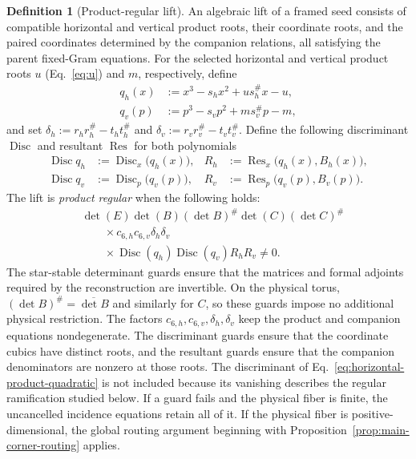 \documentclass[aps,prx,reprint,nofootinbib,twoside,superscriptaddress,longbibliography,floatfix]{revtex4-2}
\theoremstyle{definition}
\newtheorem{definition}[theorem]{Definition}
\begin{document}
\begin{definition}[Product-regular lift]
\label{def:product-regularity}
An algebraic lift of a framed seed consists of compatible horizontal and vertical product roots, their coordinate roots, and the paired coordinates determined by the companion relations, all satisfying the parent fixed-Gram equations. For the selected horizontal and vertical product roots $u$ (Eq.~\ref{eq:u}) and $m$, respectively, define
\begin{equation}
\begin{aligned}
q_h(x)&:=x^3-s_hx^2+us_h^\#x-u,\\
q_v(p)&:=p^3-s_vp^2+ms_v^\#p-m,
\end{aligned}
\end{equation}
and set $\delta_h:=r_hr_h^\#-t_ht_h^\#$ and $\delta_v:=r_vr_v^\#-t_vt_v^\#$. Define the following discriminant $\operatorname{Disc}$ and resultant $\operatorname{Res}$ for both polynomials
\begin{equation}
\begin{aligned}
\operatorname{Disc}q_h&:=\operatorname{Disc}_x\bigl(q_h(x)\bigr),&
R_h&:=\operatorname{Res}_x\bigl(q_h(x),B_h(x)\bigr),\\
\operatorname{Disc}q_v&:=\operatorname{Disc}_p\bigl(q_v(p)\bigr),&
R_v&:=\operatorname{Res}_p\bigl(q_v(p),B_v(p)\bigr).
\end{aligned}
\label{eq:product-regularity-auxiliary-guards}
\end{equation}
The lift is \emph{product regular} when the following holds:
\begin{equation}
\begin{aligned}
&\det(E)\det(B)(\det B)^\#\det(C)(\det C)^\#\\
&\qquad{}\times c_{6,h}c_{6,v}\delta_h\delta_v\\
&\qquad{}\times\operatorname{Disc}(q_h)\operatorname{Disc}(q_v)R_hR_v\neq0.
\end{aligned}
\label{eq:product-regularity-guards}
\end{equation}
The star-stable determinant guards ensure that the matrices and formal adjoints required by the reconstruction are invertible. On the physical torus, $(\det B)^\#=\overline{\det B}$ and similarly for $C$, so these guards impose no additional physical restriction. The factors $c_{6,h},c_{6,v},\delta_h,\delta_v$ keep the product and companion equations nondegenerate. The discriminant guards ensure that the coordinate cubics have distinct roots, and the resultant guards ensure that the companion denominators are nonzero at those roots. 
The discriminant of Eq.~\ref{eq:horizontal-product-quadratic} is not included because its vanishing describes the regular ramification studied below. 
If a guard fails and the physical fiber is finite, the uncancelled incidence equations retain all of it. If the physical fiber is positive-dimensional, the global routing argument beginning with Proposition~\ref{prop:main-corner-routing} applies.
\end{definition}
\end{document}
